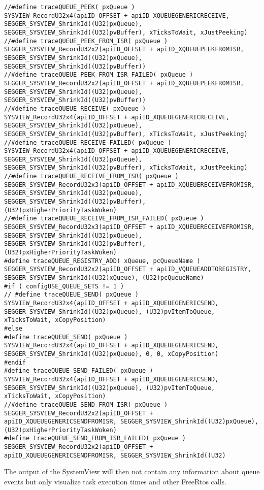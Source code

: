 \begin{lstlisting}
//#define traceQUEUE_PEEK( pxQueue )                                    SYSVIEW_RecordU32x4(apiID_OFFSET + apiID_XQUEUEGENERICRECEIVE, SEGGER_SYSVIEW_ShrinkId((U32)pxQueue), SEGGER_SYSVIEW_ShrinkId((U32)pvBuffer), xTicksToWait, xJustPeeking)
//#define traceQUEUE_PEEK_FROM_ISR( pxQueue )                           SEGGER_SYSVIEW_RecordU32x2(apiID_OFFSET + apiID_XQUEUEPEEKFROMISR, SEGGER_SYSVIEW_ShrinkId((U32)pxQueue), SEGGER_SYSVIEW_ShrinkId((U32)pvBuffer))
//#define traceQUEUE_PEEK_FROM_ISR_FAILED( pxQueue )                    SEGGER_SYSVIEW_RecordU32x2(apiID_OFFSET + apiID_XQUEUEPEEKFROMISR, SEGGER_SYSVIEW_ShrinkId((U32)pxQueue), SEGGER_SYSVIEW_ShrinkId((U32)pvBuffer))
//#define traceQUEUE_RECEIVE( pxQueue )                                 SYSVIEW_RecordU32x4(apiID_OFFSET + apiID_XQUEUEGENERICRECEIVE, SEGGER_SYSVIEW_ShrinkId((U32)pxQueue), SEGGER_SYSVIEW_ShrinkId((U32)pvBuffer), xTicksToWait, xJustPeeking)
//#define traceQUEUE_RECEIVE_FAILED( pxQueue )                          SYSVIEW_RecordU32x4(apiID_OFFSET + apiID_XQUEUEGENERICRECEIVE, SEGGER_SYSVIEW_ShrinkId((U32)pxQueue), SEGGER_SYSVIEW_ShrinkId((U32)pvBuffer), xTicksToWait, xJustPeeking)
//#define traceQUEUE_RECEIVE_FROM_ISR( pxQueue )                        SEGGER_SYSVIEW_RecordU32x3(apiID_OFFSET + apiID_XQUEUERECEIVEFROMISR, SEGGER_SYSVIEW_ShrinkId((U32)pxQueue), SEGGER_SYSVIEW_ShrinkId((U32)pvBuffer), (U32)pxHigherPriorityTaskWoken)
//#define traceQUEUE_RECEIVE_FROM_ISR_FAILED( pxQueue )                 SEGGER_SYSVIEW_RecordU32x3(apiID_OFFSET + apiID_XQUEUERECEIVEFROMISR, SEGGER_SYSVIEW_ShrinkId((U32)pxQueue), SEGGER_SYSVIEW_ShrinkId((U32)pvBuffer), (U32)pxHigherPriorityTaskWoken)
#define traceQUEUE_REGISTRY_ADD( xQueue, pcQueueName )                SEGGER_SYSVIEW_RecordU32x2(apiID_OFFSET + apiID_VQUEUEADDTOREGISTRY, SEGGER_SYSVIEW_ShrinkId((U32)xQueue), (U32)pcQueueName)
#if ( configUSE_QUEUE_SETS != 1 )
// #define traceQUEUE_SEND( pxQueue )                                    SYSVIEW_RecordU32x4(apiID_OFFSET + apiID_XQUEUEGENERICSEND, SEGGER_SYSVIEW_ShrinkId((U32)pxQueue), (U32)pvItemToQueue, xTicksToWait, xCopyPosition)
#else
#define traceQUEUE_SEND( pxQueue )                                    SYSVIEW_RecordU32x4(apiID_OFFSET + apiID_XQUEUEGENERICSEND, SEGGER_SYSVIEW_ShrinkId((U32)pxQueue), 0, 0, xCopyPosition)
#endif
#define traceQUEUE_SEND_FAILED( pxQueue )                             SYSVIEW_RecordU32x4(apiID_OFFSET + apiID_XQUEUEGENERICSEND, SEGGER_SYSVIEW_ShrinkId((U32)pxQueue), (U32)pvItemToQueue, xTicksToWait, xCopyPosition)
//#define traceQUEUE_SEND_FROM_ISR( pxQueue )                           SEGGER_SYSVIEW_RecordU32x2(apiID_OFFSET + apiID_XQUEUEGENERICSENDFROMISR, SEGGER_SYSVIEW_ShrinkId((U32)pxQueue), (U32)pxHigherPriorityTaskWoken)
#define traceQUEUE_SEND_FROM_ISR_FAILED( pxQueue )                    SEGGER_SYSVIEW_RecordU32x2(apiID_OFFSET + apiID_XQUEUEGENERICSENDFROMISR, SEGGER_SYSVIEW_ShrinkId((U32)
\end{lstlisting}
The output of the SystemView will then not contain any information about queue events but only visualize task execution times and other FreeRtos calls.
%
%
%
%
%
%
%

